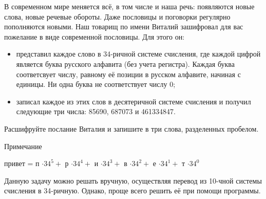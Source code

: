 
В современном мире меняется всё, в том числе и наша речь: появляются новые слова, новые речевые обороты. Даже пословицы и поговорки регулярно пополняются новыми. Наш товарищ по имени Виталий зашифровал для вас пожелание в виде современной пословицы. Для этого он:
\begin{itemize}
\item представил каждое слово в 34-ричной системе счисления, где каждой цифрой является буква русского алфавита (без учета регистра). Каждая буква соответсвует числу, равному её позиции в русском алфавите, начиная с единицы. Ни одна буква не соответствует числу 0; 
\item записал каждое из этих слов в десятеричной системе счисления и получил следующие три числа: 85690, 687073 и 461334847. 
\end{itemize}

Расшифруйте послание Виталия и 
запишите в три слова, разделенных пробелом.

Примечание

привет = п $\cdot 34^5 +$ р $\cdot 34^4 +$ и $\cdot 34^3 +$ в $\cdot 34^2 +$ е $\cdot 34^1 +$ т $\cdot 34^0$ 

\solutionSection
Данную задачу можно решать вручную, осуществляя перевод из 10-чной системы счисления в 34-ричную. Однако, проще всего решить её при помощи программы.


